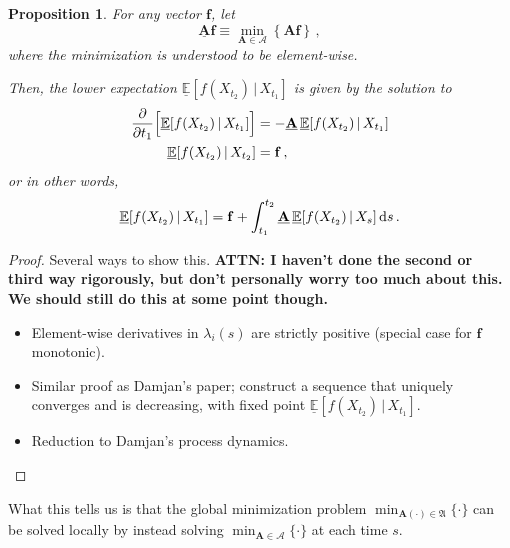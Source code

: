 \documentclass[10pt]{article}
\newtheorem{proposition}[theorem]{Proposition}
\newcommand{\dx}[1][x]{\text{\,d}#1}
\begin{document}
\begin{proposition}
For any vector $\mathbf{f}$, let
\begin{equation*}
\underline{\mathbf{A}}\mathbf{f} \equiv \min_{\mathbf{A}\in\mathcal{A}}\left\{\mathbf{A}\mathbf{f}\right\}\,,
\end{equation*}
where the minimization is understood to be element-wise. 

Then, the lower expectation $\underline{\mathbb{E}}[f(X_{t_2})\,\vert\,X_{t_1}]$ is given by the solution to
\begin{align*}
\frac{\partial}{\partial t_1}\Bigl[\underline{\mathbb{E}}[f(X_{t_2})\,\vert\,X_{t_1}]\Bigr] &= -\underline{\mathbf{A}}\, \underline{\mathbb{E}}[f(X_{t_2})\,\vert\,X_{t_1}] \\
\underline{\mathbb{E}}[f(X_{t_2})\,\vert\,X_{t_2}] &= \mathbf{f}\,,
\end{align*}
or in other words,
\begin{equation*}
\underline{\mathbb{E}}[f(X_{t_2})\,\vert\,X_{t_1}] = \mathbf{f} + \int_{t_1}^{t_2}\underline{\mathbf{A}}\,\underline{\mathbb{E}}[f(X_{t_2})\,\vert\,X_s]\dx[s]\,.
\end{equation*}
\end{proposition}
\begin{proof}
Several ways to show this. {\bf ATTN: I haven't done the second or third way rigorously, but don't personally worry too much about this. We should still do this at some point though.}
\begin{itemize}
\item Element-wise derivatives in $\lambda_i(s)$ are strictly positive (special case for $\mathbf{f}$ monotonic).
\item Similar proof as Damjan's paper; construct a sequence that uniquely converges and is decreasing, with fixed point $\underline{\mathbb{E}}[f(X_{t_2})\,\vert\,X_{t_1}]$.
\item Reduction to Damjan's process dynamics.
\end{itemize}
\end{proof}
What this tells us is that the global minimization problem $\min_{\mathbf{A}(\cdot)\in\mathfrak{A}}\{\cdot\}$ can be solved locally by instead solving $\min_{\mathbf{A}\in\mathcal{A}}\{\cdot\}$ at each time $s$.
\end{document}
